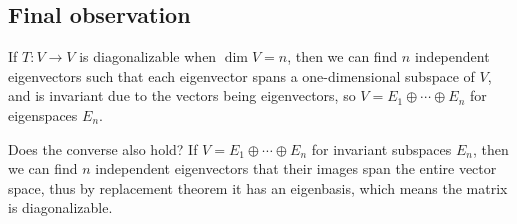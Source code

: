 \documentclass[11pt, cyan, night, 1in]{LatexTemplate/hw}
\begin{document}
\subsection{Final observation}

If $T: V\to V$ is diagonalizable when $\dim V = n$, then we can find $n$ independent eigenvectors such that each eigenvector spans a one-dimensional subspace of $V$, and is invariant due to the vectors being eigenvectors, so $V=E_1\oplus \cdots \oplus E_n$ for eigenspaces $E_n$. 

Does the converse also hold? If $V=E_1\oplus \cdots \oplus E_n$ for invariant subspaces $E_n$, then we can find $n$ independent eigenvectors that their images span the entire vector space, thus by replacement theorem it has an eigenbasis, which means the matrix is diagonalizable.
\end{document}
